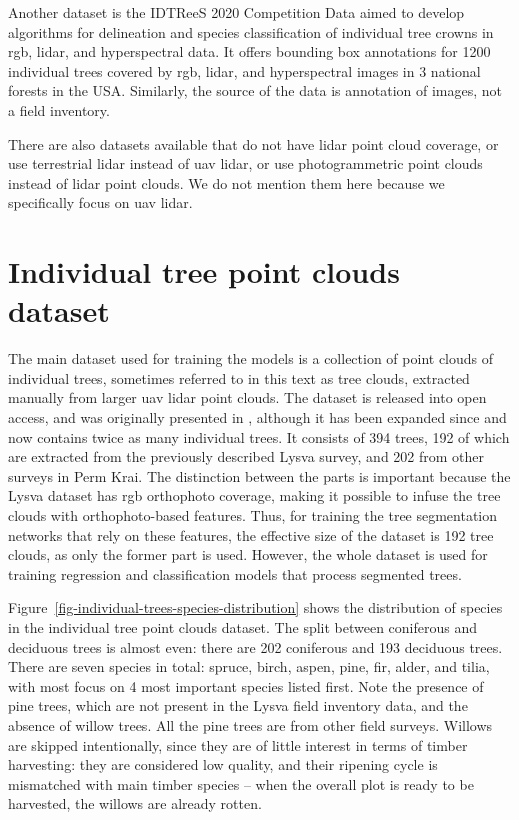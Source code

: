 Another dataset is the IDTReeS 2020 Competition Data \cite{gravesIDTReeS2020Competition2020} aimed to develop algorithms for delineation and species classification of individual tree crowns in \gls{rgb}, \gls{lidar}, and hyperspectral data.
It offers bounding box annotations for 1200 individual trees covered by \gls{rgb}, \gls{lidar}, and hyperspectral images in 3 national forests in the USA.
Similarly, the source of the data is annotation of images, not a field inventory.

There are also datasets available that do not have \gls{lidar} point cloud coverage, or use terrestrial \gls{lidar} instead of \gls{uav} \gls{lidar}, or use photogrammetric point clouds instead of \gls{lidar} point clouds.
We do not mention them here because we specifically focus on \gls{uav} \gls{lidar}.

\section{Individual tree point clouds dataset}\label{sec-individual-trees-dataset}

The main dataset used for training the models is a collection of point clouds of individual trees, sometimes referred to in this text as tree clouds, extracted manually from larger \gls{uav} \gls{lidar} point clouds.
The dataset is released into open access, and was originally presented in \citep{dubrovinExplorationPropertiesPoint2024}, although it has been expanded since and now contains twice as many individual trees.
It consists of 394 trees, 192 of which are extracted from the previously described Lysva survey, and 202 from other surveys in Perm Krai.
The distinction between the parts is important because the Lysva dataset has \gls{rgb} orthophoto coverage, making it possible to infuse the tree clouds with orthophoto-based features.
Thus, for training the tree segmentation networks that rely on these features, the effective size of the dataset is 192 tree clouds, as only the former part is used.
However, the whole dataset is used for training regression and classification models that process segmented trees.

Figure~\ref{fig-individual-trees-species-distribution} shows the distribution of species in the individual tree point clouds dataset.
The split between coniferous and deciduous trees is almost even: there are 202 coniferous and 193 deciduous trees.
There are seven species in total: spruce, birch, aspen, pine, fir, alder, and tilia, with most focus on 4 most important species listed first.
Note the presence of pine trees, which are not present in the Lysva field inventory data, and the absence of willow trees.
All the pine trees are from other field surveys.
Willows are skipped intentionally, since they are of little interest in terms of timber harvesting: they are considered low quality, and their ripening cycle is mismatched with main timber species – when the overall plot is ready to be harvested, the willows are already rotten.


